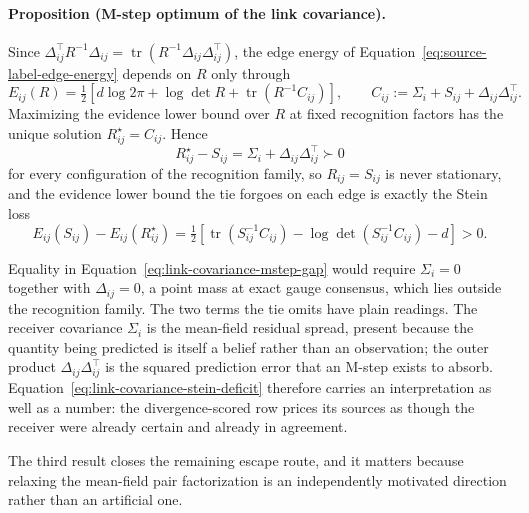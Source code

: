 \paragraph{Proposition (M-step optimum of the link covariance).} Since \(\Delta_{ij}^\top R^{-1}\Delta_{ij}=\operatorname{tr}(R^{-1}\Delta_{ij}\Delta_{ij}^\top)\), the edge energy of Equation~\eqref{eq:source-label-edge-energy} depends on \(R\) only through
\begin{equation}
E_{ij}(R)=\tfrac12\left[d\log2\pi+\log\det R+\operatorname{tr}\left(R^{-1}C_{ij}\right)\right],
\qquad
C_{ij}:=\Sigma_i+S_{ij}+\Delta_{ij}\Delta_{ij}^\top.
\label{eq:link-covariance-sufficient-statistic}
\end{equation}
Maximizing the evidence lower bound over \(R\) at fixed recognition factors has the unique solution \(R^\star_{ij}=C_{ij}\). Hence
\begin{equation}
R^\star_{ij}-S_{ij}=\Sigma_i+\Delta_{ij}\Delta_{ij}^\top\succ0
\label{eq:link-covariance-mstep-gap}
\end{equation}
for every configuration of the recognition family, so \(R_{ij}=S_{ij}\) is never stationary, and the evidence lower bound the tie forgoes on each edge is exactly the Stein loss
\begin{equation}
E_{ij}(S_{ij})-E_{ij}(R^\star_{ij})=\tfrac12\left[\operatorname{tr}\left(S_{ij}^{-1}C_{ij}\right)-\log\det\left(S_{ij}^{-1}C_{ij}\right)-d\right]>0.
\label{eq:link-covariance-stein-deficit}
\end{equation}

Equality in Equation~\eqref{eq:link-covariance-mstep-gap} would require \(\Sigma_i=0\) together with \(\Delta_{ij}=0\), a point mass at exact gauge consensus, which lies outside the recognition family. The two terms the tie omits have plain readings. The receiver covariance \(\Sigma_i\) is the mean-field residual spread, present because the quantity being predicted is itself a belief rather than an observation; the outer product \(\Delta_{ij}\Delta_{ij}^\top\) is the squared prediction error that an M-step exists to absorb. Equation~\eqref{eq:link-covariance-stein-deficit} therefore carries an interpretation as well as a number: the divergence-scored row prices its sources as though the receiver were already certain and already in agreement.

The third result closes the remaining escape route, and it matters because relaxing the mean-field pair factorization is an independently motivated direction rather than an artificial one.

